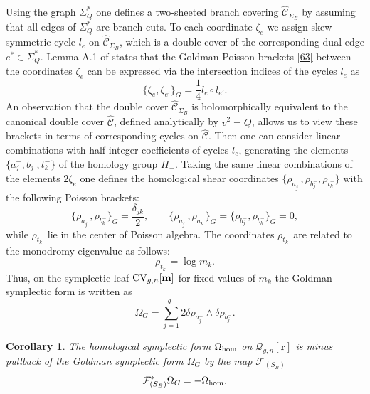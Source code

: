 \documentclass[pdftex]{sigma}
\numberwithin{equation}{section}
\newtheorem{Corollary}[Theorem]{Corollary}
\theoremstyle{definition}
\begin{document}
Using the graph $\Sigma^*_Q$ one defines a two-sheeted branch covering $\hat{\mathcal{C}}_{\Sigma_B}$ by assuming that all edges of $\Sigma^*_Q$ are branch cuts. To each coordinate $\zeta_e$ we assign skew-symmetric cycle $l_e$ on $\hat{\mathcal{C}}_{\Sigma_B}$, which is a double cover of the corresponding dual edge $e^* \in \Sigma^*_Q$. Lemma A.1 of \cite{bertola2021wkb} states that the Goldman Poisson brackets \eqref{63} between the coordinates $\zeta_e$ can be expressed via the intersection indices of the cycles $l_e$ as
\begin{equation*}
\{\zeta_e, \zeta_{e'}\}_G=\frac{1}{4}l_e \circ l_{e'}.
\end{equation*}
An observation \cite[Proposition A.6]{bertola2021wkb} that the double cover $\hat{\mathcal{C}}_{\Sigma_B}$ is holomorphically equivalent to the canonical double cover $\hat{\mathcal{C}}$, defined analytically by $v^2=Q$, allows us to view these brackets in terms of corresponding cycles on $\hat{\mathcal{C}}$. Then one can consider linear combinations with half-integer coefficients of cycles $l_e$, generating the elements $\big\{a^-_j, b^-_j, t^-_k\big\}$ of the homology group
$H_-$. Taking the same linear combinations of the elements $2\zeta_e$ one defines the homological shear coordinates $\big\{\rho_{a^-_j}, \rho_{b^-_j}, \rho_{t^-_k}\big\}$ with the following Poisson brackets:
\begin{equation}\label{homsc}
 \big\{\rho_{a^-_j},\rho_{b^-_k} \big\}_{G}=\frac{\delta_{jk}}{2}, \qquad \big\{\rho_{a^-_j},\rho_{a^-_k} \big\}_{G}=\big\{\rho_{b^-_j},\rho_{b^-_k} \big\}_{G}=0, \end{equation}
while $\rho_{t^-_k}$ lie in the center of Poisson algebra.
The coordinates $\rho_{t^-_k}$
are related to the monodromy eigenvalue as follows:
\begin{equation*}\rho_{t^-_k}=\log m_k.\end{equation*}
Thus, on the symplectic leaf ${\rm CV}_{g,n}[\mathbf{m}]$ for fixed values of $m_k$ the Goldman symplectic form is written as
\begin{equation*}%
\Omega_{G}=\sum^{g^-}_{j=1} 2 \delta\rho_{a^-_j} \wedge \delta\rho_{b^-_j}.
\end{equation*}

\begin{Corollary}
The homological symplectic form $\Omega_{{\rm hom}}$ on $\mathcal{Q}_{g,n}[\mathbf{r}]$ is minus pullback of the Goldman symplectic form $\Omega_{G}$ by the map $\mathcal{F}_{(S_B)}$
\begin{equation*}\mathcal{F}_{(S_B)}^*\Omega_{G}=-\Omega_{{\rm hom}}. \end{equation*}
\end{Corollary}
\end{document}

